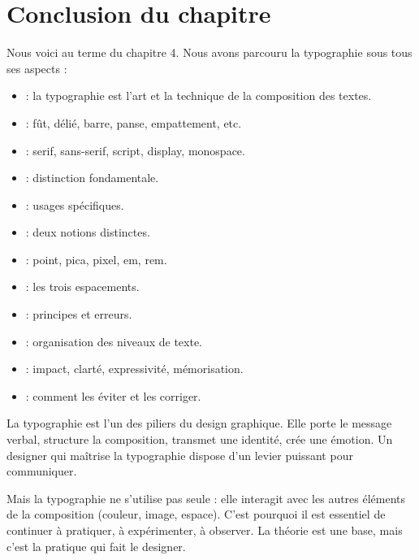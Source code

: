 \section*{Conclusion du chapitre}

Nous voici au terme du chapitre 4. Nous avons parcouru la typographie sous tous ses aspects :

\begin{itemize}
    \item {} : la typographie est l'art et la technique de la composition des textes.
    \item {} : fût, délié, barre, panse, empattement, etc.
    \item {} : serif, sans-serif, script, display, monospace.
    \item {} : distinction fondamentale.
    \item {} : usages spécifiques.
    \item {} : deux notions distinctes.
    \item {} : point, pica, pixel, em, rem.
    \item {} : les trois espacements.
    \item {} : principes et erreurs.
    \item {} : organisation des niveaux de texte.
    \item {} : impact, clarté, expressivité, mémorisation.
    \item {} : comment les éviter et les corriger.
\end{itemize}

La typographie est l'un des piliers du design graphique. Elle porte le message verbal, structure la composition, transmet une identité, crée une émotion. Un designer qui maîtrise la typographie dispose d'un levier puissant pour communiquer.

Mais la typographie ne s'utilise pas seule : elle interagit avec les autres éléments de la composition (couleur, image, espace). C'est pourquoi il est essentiel de continuer à pratiquer, à expérimenter, à observer. La théorie est une base, mais c'est la pratique qui fait le designer.

